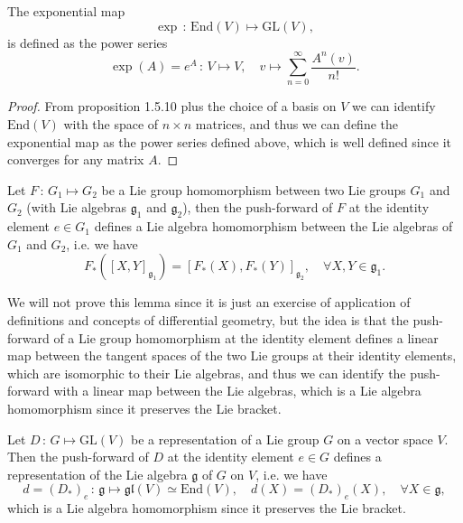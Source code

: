 \begin{lemma}
    The exponential map
    \[
        \exp \,:\, \mathrm{End}(V) \mapsto \mathrm{GL}(V),
    \]
    is defined as the power series
    \[
        \exp(A) = e^A \,:\, V \mapsto V, \quad v \mapsto \sum_{n=0}^{\infty} \frac{A^n(v)}{n!}.
    \]
\end{lemma}

\begin{proof}
    From proposition 1.5.10 plus the choice of a basis on \(V\) we can identify \(\mathrm{End}(V)\) with the space of \(n \times n\) matrices, and thus we can define the exponential map as the power series defined above, which is well defined since it converges for any matrix \(A\).
\end{proof}

\begin{lemma}
    Let \(F \,:\, G_1 \mapsto G_2\) be a Lie group homomorphism between two Lie groups \(G_1\) and \(G_2\) (with Lie algebras \(\mathfrak{g}_1\) and \(\mathfrak{g}_2\)), then the push-forward of \(F\) at the identity element \(e \in G_1\) defines a Lie algebra homomorphism between the Lie algebras of \(G_1\) and \(G_2\), i.e. we have
    \[
        F_*([X,Y]_{\mathfrak{g}_1}) = [F_*(X), F_*(Y)]_{\mathfrak{g}_2}, \quad \forall X,Y \in \mathfrak{g}_1.
    \]
\end{lemma}

We will not prove this lemma since it is just an exercise of application of definitions and concepts of differential geometry, but the idea is that the push-forward of a Lie group homomorphism at the identity element defines a linear map between the tangent spaces of the two Lie groups at their identity elements, which are isomorphic to their Lie algebras, and thus we can identify the push-forward with a linear map between the Lie algebras, which is a Lie algebra homomorphism since it preserves the Lie bracket.

\begin{proposition}
    Let \(D \,:\, G \mapsto \mathrm{GL}(V)\) be a representation of a Lie group \(G\) on a vector space \(V\). Then the push-forward of \(D\) at the identity element \(e \in G\) defines a representation of the Lie algebra \(\mathfrak{g}\) of \(G\) on \(V\), i.e. we have
    \[
        d = (D_*)_e \,:\, \mathfrak{g} \mapsto \mathfrak{gl}(V)\simeq\mathrm{End}(V), \quad d(X) = (D_*)_e(X), \quad \forall X \in \mathfrak{g},
    \]
    which is a Lie algebra homomorphism since it preserves the Lie bracket.
\end{proposition}

